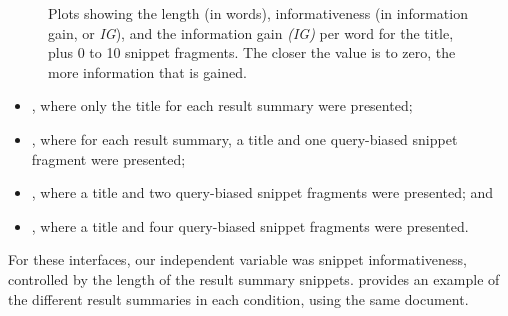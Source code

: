 \begin{figure}[t!]
    \centering
    \caption[Information gain plots]{Plots showing the length (in words), informativeness (in information gain, or \emph{IG}), and the information gain \emph{(IG)} per word for the title, plus 0 to 10 snippet fragments. The closer the value is to zero, the more information that is gained.}
    \label{fig:ig_plots}
\end{figure}

\begin{itemize}
    \item{, where only the title for each result summary were presented;}
    \item{, where for each result summary, a title and one query-biased snippet fragment were presented;}
    \item{, where a title and two query-biased snippet fragments were presented; and}
    \item{, where a title and four query-biased snippet fragments were presented.}
\end{itemize}

For these interfaces, our independent variable was snippet informativeness, controlled by the length of the result summary snippets.  provides an example of the different result summaries in each condition, using the same document.

